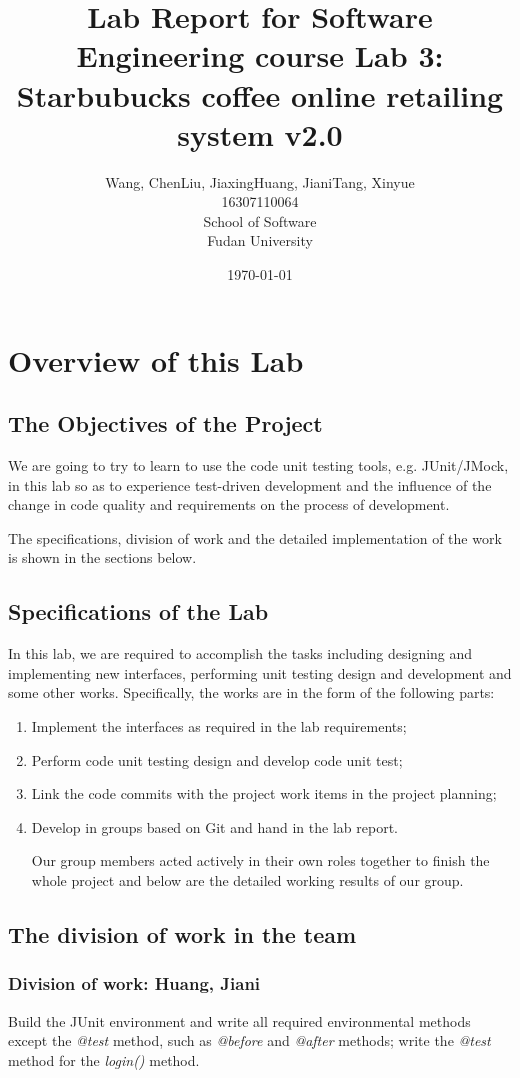 \documentclass[a4paper]{report}
\title{Lab Report for Software Engineering course \newline
 Lab 3: Starbubucks coffee online retailing system v2.0}
\author{Wang, Chen\qquad Liu, Jiaxing\qquad Huang, Jiani\qquad Tang, Xinyue \\
16307110064\qquad17302010049\qquad 17302010063\qquad 16307110476 \\
School of Software\\
Fudan University
}
\date{\today}
\begin{document}
\maketitle

\tableofcontents
\chapter{Overview of this Lab}
\section{The Objectives of the Project}
We are going to try to learn to use the code unit testing tools, e.g. JUnit/JMock, in this lab so as to experience test-driven development and the influence of the change in code quality and requirements on the process of development.
\par
The specifications, division of work and the detailed implementation of the work is shown in the sections below.
\section{Specifications of the Lab}
In this lab, we are required to accomplish the tasks including designing and implementing new interfaces, performing unit testing design and development and some other works. Specifically, the works are in the form of the following parts:
\begin{enumerate}
\item Implement the interfaces as required in the lab requirements;
\item Perform code unit testing design and develop code unit test;
\item Link the code commits with the project work items in the project planning;
\item Develop in groups based on Git and hand in the lab report.
\par
Our group members acted actively in their own roles together to finish the whole project and below are the detailed working results of our group.
\end{enumerate}
\section{The division of work in the team}
\subsection{Division of work: Huang, Jiani}
Build the JUnit environment and write all required environmental methods except the \emph{@test} method, such as \emph{@before} and \emph{@after} methods; write the \emph{@test} method for the \emph{login()} method.
\end{document}
